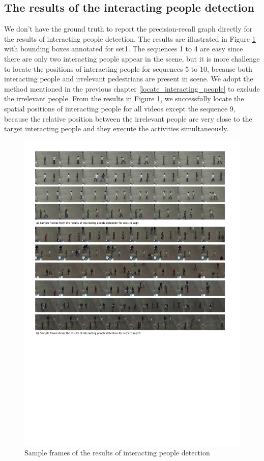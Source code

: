 \subsection{The results of the interacting people detection}
We don't have the ground truth to report the precision-recall graph directly for the results of interacting people detection. The results are illustrated in Figure \ref{fig:int_det} with bounding boxes annotated for set1. The sequences 1 to 4 are easy since there are only two interacting people appear in the scene, but it is more challenge to locate the positions of interacting people for sequences 5 to 10, because both interacting people and irrelevant pedestrians are present in scene. We adopt the method mentioned in the previous chapter \ref{locate_interacting_people} to exclude the irrelevant people. From the results in Figure \ref{fig:int_det}, we successfully locate the spatial positions of interacting people for all videos except the sequence 9, because the relative position between the irrelevant people are very close to the target interacting people and they execute the activities simultaneously.  
\begin{figure}
	\includegraphics[trim=2cm 10.5cm 0cm 1cm]{fig01/interacting_person_det.pdf}
	\caption{Sample frames of the results of interacting people detection}
	\label{fig:int_det}
\end{figure}
 
